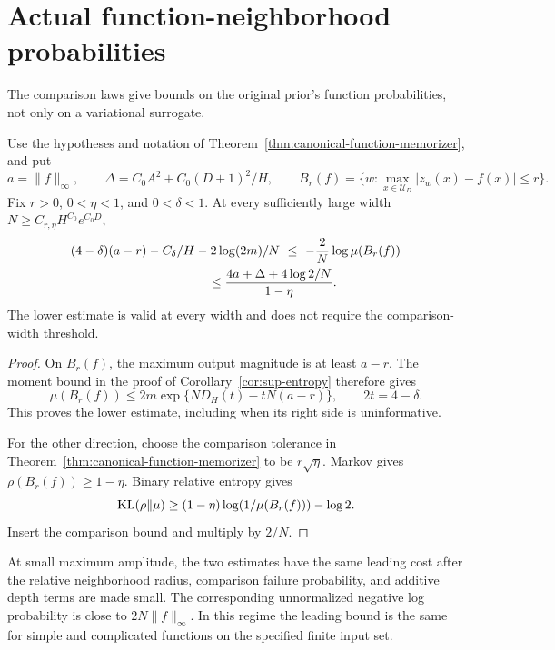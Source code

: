 \section{Actual function-neighborhood probabilities}
\label{sec:function-probabilities}
The comparison laws give bounds on the original prior's function probabilities, not only on a variational surrogate.

\begin{corollary}
\label{cor:function-neighborhood}
Use the hypotheses and notation of Theorem~\ref{thm:canonical-function-memorizer}, and put
\[
 a=\|f\|_\infty,\qquad
 \Delta=C_0A^2+C_0(D+1)^2/H,\qquad
 B_r(f)=\{w:\max_{x\in\mathcal U_D}|z_w(x)-f(x)|\le r\}.
\]
Fix $r>0$, $0<\eta<1$, and $0<\delta<1$. At every sufficiently large width $N\ge C_{r,\eta}H^{C_0}e^{C_0D}$,
\begin{align}
 &(4-\delta)(a-r)-C_\delta/H-2\log(2m)/N
 \ \le\ -\frac2N\log\mu(B_r(f))\notag\\
 &\hspace{38mm}\le
 \frac{4a+\Delta+4\log2/N}{1-\eta}.
 \label{eq:function-probabilities}
\end{align}
The lower estimate is valid at every width and does not require the comparison-width threshold.
\end{corollary}
\begin{proof}
On $B_r(f)$, the maximum output magnitude is at least $a-r$. The moment bound in the proof of Corollary~\ref{cor:sup-entropy} therefore gives
\[
 \mu(B_r(f))\le2m\exp\{ND_H(t)-tN(a-r)\},
 \qquad 2t=4-\delta.
\]
This proves the lower estimate, including when its right side is uninformative.

For the other direction, choose the comparison tolerance in Theorem~\ref{thm:canonical-function-memorizer} to be $r\sqrt\eta$. Markov gives $\rho(B_r(f))\ge1-\eta$. Binary relative entropy gives
\[
 \operatorname{KL}(\rho\|\mu)\ge(1-\eta)\log(1/\mu(B_r(f)))-\log2.
\]
Insert the comparison bound and multiply by $2/N$.
\end{proof}

At small maximum amplitude, the two estimates have the same leading cost after the relative neighborhood radius, comparison failure probability, and additive depth terms are made small. The corresponding unnormalized negative log probability is close to $2N\|f\|_\infty$. In this regime the leading bound is the same for simple and complicated functions on the specified finite input set.
